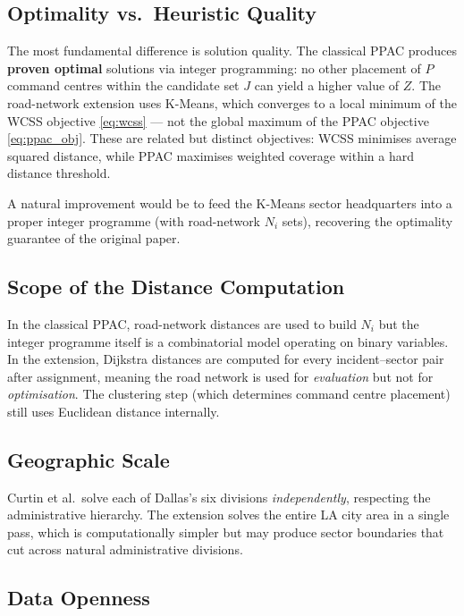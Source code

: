 \documentclass[12pt]{article}
\begin{document}
\subsection{Optimality vs.\ Heuristic Quality}

The most fundamental difference is solution quality.  The classical PPAC
produces \textbf{proven optimal} solutions via integer programming: no other
placement of $P$ command centres within the candidate set $J$ can yield a
higher value of $Z$.  The road-network extension uses K-Means, which converges
to a local minimum of the WCSS objective \eqref{eq:wcss} --- not the global
maximum of the PPAC objective \eqref{eq:ppac_obj}.  These are related but
distinct objectives: WCSS minimises average squared distance, while PPAC
maximises weighted coverage within a hard distance threshold.

A natural improvement would be to feed the K-Means sector headquarters into a
proper integer programme (with road-network $N_i$ sets), recovering the
optimality guarantee of the original paper.

\subsection{Scope of the Distance Computation}

In the classical PPAC, road-network distances are used to build $N_i$ but the
integer programme itself is a combinatorial model operating on binary variables.
In the extension, Dijkstra distances are computed for every incident--sector
pair after assignment, meaning the road network is used for \emph{evaluation}
but not for \emph{optimisation}.  The clustering step (which determines command
centre placement) still uses Euclidean distance internally.

\subsection{Geographic Scale}

Curtin et al.\ solve each of Dallas's six divisions \emph{independently},
respecting the administrative hierarchy.  The extension solves the entire LA
city area in a single pass, which is computationally simpler but may produce
sector boundaries that cut across natural administrative divisions.

\subsection{Data Openness}
\end{document}
